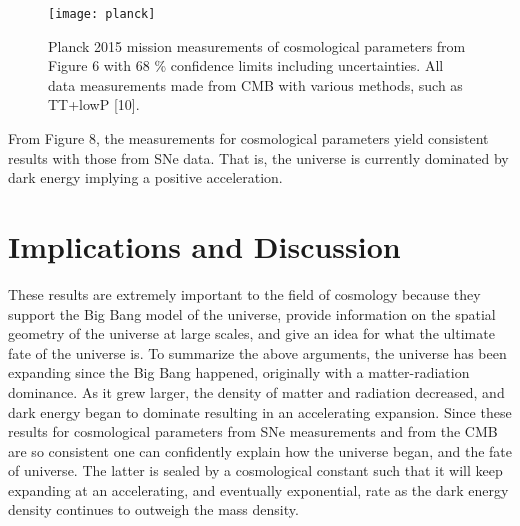 \documentclass[12pt]{article}
\begin{document}
\begin{figure}[h]
    \centering
    \texttt{[image: planck]}
    \caption{Planck 2015 mission measurements of cosmological parameters from Figure 6 with 68 \% confidence limits including uncertainties. All data measurements made from CMB with various methods, such as TT+lowP [10].
}
    \label{fig:mesh1}
\end{figure}

From Figure 8, the measurements for cosmological parameters yield consistent results with those from SNe data. That is, the universe is currently dominated by dark energy implying a positive acceleration. 
	
	
	\section{Implications and Discussion}
These results are extremely important to the field of cosmology because they support the Big Bang model of the universe, provide information on the spatial geometry of the universe at large scales, and give an idea for what the ultimate fate of the universe is. To summarize the above arguments, the universe has been expanding since the Big Bang happened, originally with a matter-radiation dominance. As it grew larger, the density of matter and radiation decreased, and dark energy began to dominate resulting in an accelerating expansion. Since these results for cosmological parameters from SNe measurements and from the CMB are so consistent one can confidently explain how the universe began, and the fate of universe. The latter is sealed by a cosmological constant such that it will keep expanding at an accelerating, and eventually exponential, rate as the dark energy density continues to outweigh the mass density. 
\end{document}
